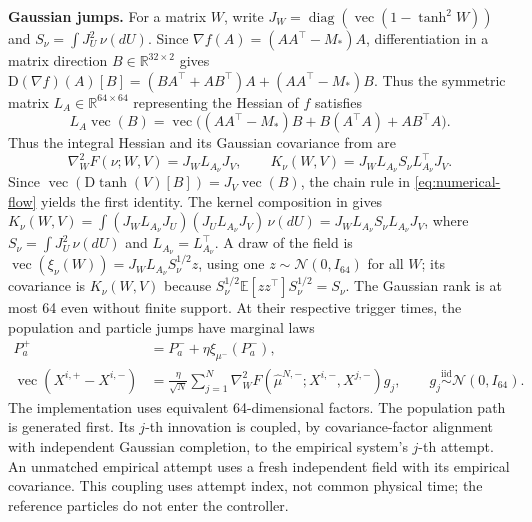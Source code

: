 \noindent\textbf{Gaussian jumps.}
For a matrix \(W\), write
\(J_W=\operatorname{diag}(\operatorname{vec}(1-\tanh^2W))\) and
\(S_\nu=\int J_U^2\,\nu(dU)\).
Since \(\nabla f(A)=(AA^\top-M_*)A\), differentiation in a matrix direction
\(B\in\mathbb R^{32\times2}\) gives
\(\mathrm D(\nabla f)(A)[B]=(BA^\top+AB^\top)A+(AA^\top-M_*)B\).
Thus the symmetric matrix \(L_A\in\mathbb R^{64\times64}\) representing the
Hessian of \(f\) satisfies
\[
 L_A\operatorname{vec}(B)=\operatorname{vec}\bigl(
 (AA^\top-M_*)B+B(A^\top A)+AB^\top A\bigr).
\]
Thus the integral Hessian and its Gaussian covariance from
 are
\begin{equation}
 \nabla_W^2F(\nu;W,V)=J_WL_{A_\nu}J_V,\qquad
 K_\nu(W,V)=J_WL_{A_\nu}S_\nu L_{A_\nu}^\top J_V.
 \label{eq:numerical-covariance}
\end{equation}
Since \(\operatorname{vec}(\mathrm D\tanh(V)[B])=J_V\operatorname{vec}(B)\),
the chain rule in \cref{eq:numerical-flow} yields the first identity.
The kernel composition in  gives
\(K_\nu(W,V)=\int (J_WL_{A_\nu}J_U)(J_UL_{A_\nu}J_V)\,\nu(dU)
=J_WL_{A_\nu}S_\nu L_{A_\nu}J_V\), where
\(S_\nu=\int J_U^2\,\nu(dU)\) and \(L_{A_\nu}=L_{A_\nu}^\top\).
A draw of the field is
\(\operatorname{vec}(\xi_\nu(W))=J_WL_{A_\nu}S_\nu^{1/2}z\),
using one \(z\sim\mathcal N(0,I_{64})\) for all \(W\); its covariance is
\(K_\nu(W,V)\) because
\(S_\nu^{1/2}\mathbb E[zz^\top]S_\nu^{1/2}=S_\nu\).
The Gaussian rank is at most 64 even without finite support.
At their respective trigger times, the population and particle jumps have
marginal laws
\begin{equation}
\begin{aligned}
 P_a^+&=P_a^-+\eta\xi_{\mu^-}(P_a^-),\\
 \operatorname{vec}(X^{i,+}-X^{i,-})
 &=\frac\eta{\sqrt N}\sum_{j=1}^N
 \nabla_W^2F(\widehat\mu^{N,-};X^{i,-},X^{j,-})g_j,
 \qquad g_j\overset{\mathrm{iid}}\sim\mathcal N(0,I_{64}).
\end{aligned}
\label{eq:numerical-jumps}
\end{equation}
The implementation uses equivalent 64-dimensional factors.
The population path is generated first. Its \(j\)-th innovation is coupled,
by covariance-factor alignment with independent Gaussian completion, to the
empirical system's \(j\)-th attempt. An unmatched empirical attempt uses a
fresh independent field with its empirical covariance. This coupling uses
attempt index, not common physical time; the reference particles do not enter
the controller.

